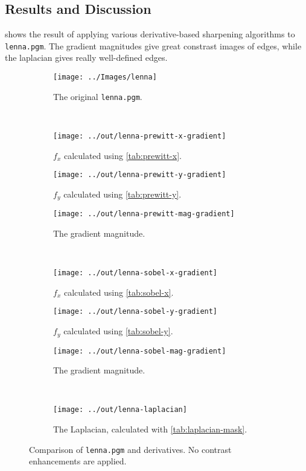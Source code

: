 \documentclass[headings=optiontoheadandtoc,listof=totoc,parskip=full]{scrartcl}
\begin{document}
\subsection{Results and Discussion}
\label{sec:gradient-results}

 shows the result of applying various derivative-based sharpening algorithms to \texttt{lenna.pgm}. The gradient magnitudes give great constrast images of edges, while the laplacian gives really well-defined edges.

\begin{figure}[H]
	\centering
	\begin{subfigure}[t]{.3\textwidth}
		\centering
		\texttt{[image: ../Images/lenna]}
		\caption{The original \texttt{lenna.pgm}.}
	\end{subfigure}
	\\
	\begin{subfigure}[t]{.3\textwidth}
		\centering
		\texttt{[image: ../out/lenna-prewitt-x-gradient]}
		\caption{$f_x$ calculated using \cref{tab:prewitt-x}.}
	\end{subfigure}
	\hfill
	\begin{subfigure}[t]{.3\textwidth}
		\centering
		\texttt{[image: ../out/lenna-prewitt-y-gradient]}
		\caption{$f_y$ calculated using \cref{tab:prewitt-y}.}
	\end{subfigure}
	\hfill
	\begin{subfigure}[t]{.3\textwidth}
		\centering
		\texttt{[image: ../out/lenna-prewitt-mag-gradient]}
		\caption{The gradient magnitude.}
	\end{subfigure}
	\\
	\begin{subfigure}[t]{.3\textwidth}
		\centering
		\texttt{[image: ../out/lenna-sobel-x-gradient]}
		\caption{$f_x$ calculated using \cref{tab:sobel-x}.}
	\end{subfigure}
	\hfill
	\begin{subfigure}[t]{.3\textwidth}
		\centering
		\texttt{[image: ../out/lenna-sobel-y-gradient]}
		\caption{$f_y$ calculated using \cref{tab:sobel-y}.}
	\end{subfigure}
	\hfill
	\begin{subfigure}[t]{.3\textwidth}
		\centering
		\texttt{[image: ../out/lenna-sobel-mag-gradient]}
		\caption{The gradient magnitude.}
	\end{subfigure}
	\\
	\begin{subfigure}[t]{.3\textwidth}
		\centering
		\texttt{[image: ../out/lenna-laplacian]}
		\caption{The Laplacian, calculated with \cref{tab:laplacian-mask}.}
	\end{subfigure}

	\caption{Comparison of \texttt{lenna.pgm} and derivatives. No contrast enhancements are applied.}
	\label{fig:gradient-lenna}
\end{figure}
\end{document}
